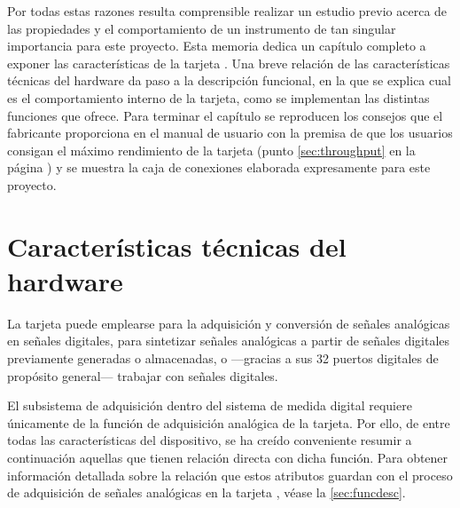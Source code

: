 Por todas estas razones resulta comprensible realizar un estudio previo
acerca de las propiedades y el comportamiento de un instrumento de tan
singular importancia para este proyecto. Esta memoria dedica un capítulo
completo a exponer las características de la tarjeta \kpci{}. Una breve
relación de las características técnicas del hardware da paso a la
descripción funcional, en la que se explica cual es el comportamiento
interno de la tarjeta, como se implementan las distintas funciones que
ofrece. Para terminar el capítulo se reproducen los consejos que el
fabricante proporciona en el manual de usuario con la premisa de que los
usuarios consigan el máximo rendimiento de la tarjeta (punto
\ref{sec:throughput} en la página \pageref{sec:throughput}) y se muestra la
caja de conexiones elaborada expresamente para este proyecto.


\section{Características técnicas del hardware}\label{sec:technical}

La tarjeta \kpci{} puede emplearse para la adquisición y conversión de
señales analógicas en señales digitales, para sintetizar señales analógicas
a partir de señales digitales previamente generadas o almacenadas, o
---gracias a sus 32 puertos digitales de propósito general--- trabajar con
señales digitales.

El subsistema de adquisición dentro del sistema de medida digital requiere
únicamente de la función de adquisición analógica de la tarjeta. Por ello,
de entre todas las características del dispositivo, se ha creído
conveniente resumir a continuación aquellas que tienen relación directa con
dicha función. Para obtener información detallada sobre la relación que
estos atributos guardan con el proceso de adquisición de señales analógicas
en la tarjeta \kpci{}, véase la \vref{sec:funcdesc}.

